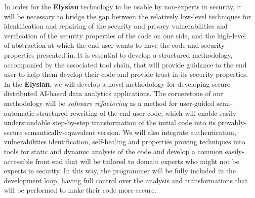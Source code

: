 \documentclass[a4paper,11pt]{article}
\newcommand{\project}[1]{\textbf{#1}\xspace}
\newcommand{\SECURITY}{\project{Elysian}}
\newcommand{\TheProject}{\SECURITY}
\begin{document}
In order for the \TheProject{} technology to be usable by non-experts in security, it will be necessary to bridge the gap between the relatively low-level techniques for identification and repairing of the security and privacy vulnerabilities and verification of the security properties of the code on one side, and the high-level of abstraction at which the end-user wants to have the code and security properties presented in. It is essential to develop a structured methodology, accompanied by the associated tool chain, that will provide guidance to the end user to help them develop their code and provide trust in its security properties. In the \TheProject{}, we will develop a novel methodology for developing secure distributed AI-based data analytics applications. The cornerstone of our methodology will be \emph{software refactoring} as a method for user-guided semi-automatic structured rewriting of the end-user code, which will enable easily understandable step-by-step transformation of the initial code into its provably-secure semantically-equivalent version. We will also integrate authentication, vulnerabilities identification, self-healing and properties proving techniques into tools for static and dynamic analysis of the code and develop a common easily-accessible front end that will be tailored to domain experts who might not be experts in security. In this way, the programmer will be fully included in the development loop, having full control over the analysis and transformations that will be performed to make their code more secure. %
\end{document}
